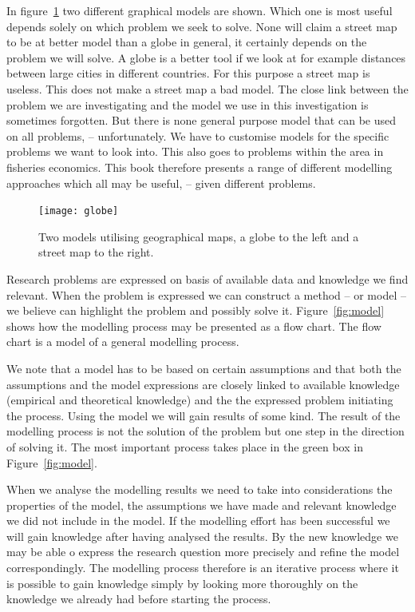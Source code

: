 \documentclass[11pt,fleqn]{book} %
\begin{document}
In figure~\ref{fig:globe} two different graphical models are shown. Which one is most useful depends solely on which problem we seek to solve. None will claim a street map to be at better model than a globe in general, it certainly depends on the problem we will solve. A globe is a better tool if we look at for example distances between large cities in different countries. For this purpose a street map is useless. This does not make a street map a bad model. The close link between the problem we are investigating and the model we use in this investigation is sometimes forgotten. But there is none general purpose model that can be used on all problems, -- unfortunately. We have to customise models for the specific problems we want to look into. This also goes to problems within the area in fisheries economics. This book therefore presents a range of different modelling approaches which all may be useful, -- given different problems.

\begin{figure}[ht]
\centering\texttt{[image: globe]} 
\caption{Two models utilising geographical maps, a globe to the left and a street map to the right.\\}
\label{fig:globe}
\end{figure}

Research problems are expressed on basis of available data and knowledge we find relevant. When the problem is expressed we can construct a method -- or model -- we believe can highlight the problem and possibly solve it. Figure~\ref{fig:model} shows how the modelling process may be presented as a flow chart. The flow chart is a model of a general modelling process.

We note that a model has to be based on certain assumptions and that both the assumptions and the model expressions are closely linked to available knowledge (empirical and theoretical knowledge) and the the expressed problem initiating the process. Using the model we will gain results of some kind. The result of the modelling process is not the solution of the problem but one step in the direction of solving it. The most important process takes place in the green box in Figure~\ref{fig:model}.

When we analyse the modelling results we need to take into considerations the properties of the model, the assumptions we have made and relevant knowledge we did not include in the model. If the modelling effort has been successful we will gain knowledge after having analysed the results. By the new knowledge we may be able o express the research question more precisely and refine the model correspondingly. The modelling process therefore is an iterative process where it is possible to gain knowledge simply by looking more thoroughly on the knowledge we already had before starting the process.
\end{document}

